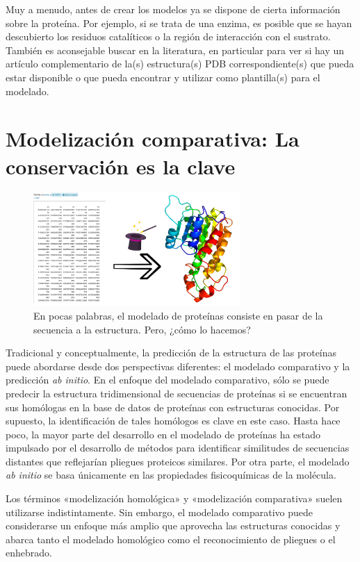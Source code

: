 Muy a menudo, antes de crear los modelos ya se dispone de cierta información sobre la proteína. Por ejemplo, si se trata de una enzima, es posible que se hayan descubierto los residuos catalíticos o la región de interacción con el sustrato. También es aconsejable buscar en la literatura, en particular para ver si hay un artículo complementario de la(s) estructura(s) PDB correspondiente(s) que pueda estar disponible o que pueda encontrar y utilizar como plantilla(s) para el modelado.

\section{Modelización comparativa: La conservación es la clave}
\begin{figure}[h]
\centering
\includegraphics[width = 0.7\textwidth]{figs/modeling.png}
\caption{En pocas palabras, el modelado de proteínas consiste en pasar de la secuencia a la estructura. Pero, ¿cómo lo hacemos?}
\end{figure}

Tradicional y conceptualmente, la predicción de la estructura de las proteínas puede abordarse desde dos perspectivas diferentes: el modelado comparativo y la predicción \textit{ab initio}. En el enfoque del modelado comparativo, sólo se puede predecir la estructura tridimensional de secuencias de proteínas si se encuentran sus homólogas en la base de datos de proteínas con estructuras conocidas. Por supuesto, la identificación de tales homólogos es clave en este caso. Hasta hace poco, la mayor parte del desarrollo en el modelado de proteínas ha estado impulsado por el desarrollo de métodos para identificar similitudes de secuencias distantes que reflejarían pliegues proteicos similares. Por otra parte, el modelado \textit{ab initio} se basa únicamente en las propiedades fisicoquímicas de la molécula.

\begin{table}[htbp]
\begin{mdframed}[backgroundcolor=black!10]
    \centering
    Los términos «modelización homológica» y «modelización comparativa» suelen utilizarse indistintamente. Sin embargo, el modelado comparativo puede considerarse un enfoque más amplio que aprovecha las estructuras conocidas y abarca tanto el modelado homológico como el reconocimiento de pliegues o el enhebrado.
    \end{mdframed}
\end{table}

